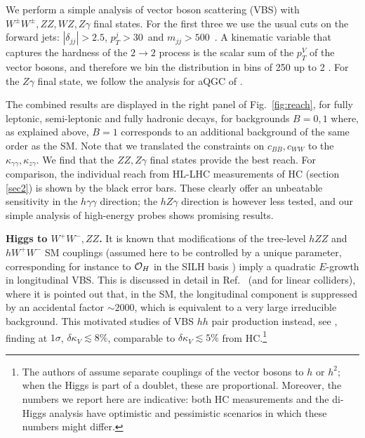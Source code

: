 We perform a simple analysis of vector boson scattering (VBS) with $W^\pm W^\pm, ZZ, WZ,Z\gamma$ final states. For the first three we use the usual cuts on the forward jets: $|\delta_{jj}|>2.5$, $p_T^j>30$~\UGeV and $m_{jj}>500$~\UGeV \cite{Aad:2014zda}. A kinematic variable that captures the hardness of the $2\to 2$ process is the scalar sum of the $p_T^V$ of the vector bosons, and therefore we bin the distribution in bins of 250 \UGeV up to 2 \UTeV. For the $Z\gamma$ final state, we follow the analysis for aQGC of \cite{Aaboud:2017pds}.

The combined results are displayed in the right panel of Fig.~\ref{fig:reach}, for fully leptonic, semi-leptonic and fully hadronic decays, for backgrounds  $B=0,1$ where, as explained above, $B=1$ corresponds to an additional background of the same order as the SM. Note that we translated the constraints on $c_{BB},c_{WW}$ to the $\kappa_{\gamma\gamma},\kappa_{z\gamma}$. We find that the $ZZ,Z\gamma$ final states provide the best reach.
For comparison, the individual reach from HL-LHC measurements of HC (section \ref{sec2}) is shown by the black error bars. These clearly offer an unbeatable sensitivity in the $h\gamma\gamma$ direction; the $hZ\gamma$ direction is however less tested, and our simple analysis of high-energy probes shows promising results.



\vspace{5mm}
\noindent
{\bf Higgs to $W^+W^-,ZZ$.}
It is  known that modifications of the tree-level $hZZ$ and $hW^+W^-$ SM couplings (assumed here to be controlled by a unique parameter, corresponding for instance to $\mathcal{O}_H$ in the SILH basis \cite{Giudice:2007fh}) imply a quadratic $E$-growth in longitudinal VBS. This is discussed in detail in Ref.~\cite{Contino:2010mh} (and \cite{Contino:2013gna} for linear colliders), where it is pointed out that, in the SM, the longitudinal component is suppressed by an accidental factor $\sim 2000$, which is equivalent to a very large irreducible background. This motivated studies of VBS $hh$ pair production instead, see \cite{Bishara:2016kjn}, finding at $1\sigma$, $\delta\kappa_V\lesssim 8\%$, comparable to $\delta\kappa_V\lesssim 5\%$ from HC.\footnote{The authors of \cite{Bishara:2016kjn} assume separate couplings of the vector bosons to $h$ or $h^2$; when the Higgs is part of a doublet, these are proportional. Moreover, the numbers we report here are indicative: both HC measurements and the di-Higgs analysis have  optimistic and pessimistic scenarios in which these numbers might differ.}




